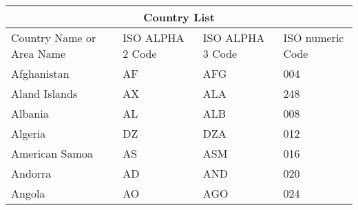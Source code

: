 \begin{tabular}{ |p{3cm}||p{3cm}|p{3cm}|p{3cm}|  }
  \hline
  \multicolumn{4}{|c|}{Country List} \\
  \hline
  Country Name     or Area Name& ISO ALPHA 2 Code &ISO ALPHA 3 Code&ISO numeric Code\\
  \hline
  Afghanistan   & AF    &AFG&   004\\
  Aland Islands&   AX  & ALA   &248\\
  Albania &AL & ALB&  008\\
  Algeria    &DZ & DZA&  012\\
  American Samoa&   AS  & ASM&016\\
  Andorra& AD  & AND   &020\\
  Angola& AO  & AGO&024\\
  \hline
 \end{tabular}